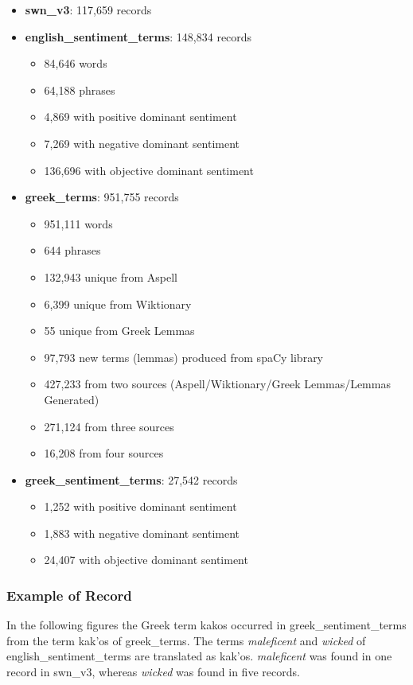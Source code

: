 \begin{itemize}
 \item \textbf{swn\_v3}: 117,659 records
 \item \textbf{english\_sentiment\_terms}: 148,834 records
 \begin{itemize}
  \item 84,646 words
  \item 64,188 phrases
  \item 4,869 with positive dominant sentiment
  \item 7,269 with negative dominant sentiment
  \item 136,696 with objective dominant sentiment
 \end{itemize}
 \item \textbf{greek\_terms}: 951,755 records
 \begin{itemize}
  \item 951,111 words
  \item 644 phrases
  \item 132,943 unique from Aspell
  \item 6,399 unique from Wiktionary
  \item 55 unique from Greek Lemmas
  \item 97,793 new terms (lemmas) produced from spaCy library
  \item 427,233 from two sources (Aspell/Wiktionary/Greek Lemmas/Lemmas Generated)
  \item 271,124 from three sources
  \item 16,208 from four sources
 \end{itemize}
 \item \textbf{greek\_sentiment\_terms}: 27,542 records
 \begin{itemize}
  \item 1,252 with positive dominant sentiment
  \item 1,883 with negative dominant sentiment
  \item 24,407 with objective dominant sentiment
 \end{itemize} 
\end{itemize}

\subsubsection{Example of Record}
\label{subsubsec:recexample}

In the following figures
the Greek term \textgreek{kakos} occurred in greek\_sentiment\_terms
from the term \textgreek{kak'os} of greek\_terms.
The terms \emph{maleficent} and \emph{wicked} of english\_sentiment\_terms
are translated as \textgreek{kak'os}.
\emph{maleficent} was found in one record in swn\_v3,
whereas \emph{wicked} was found in five records. \\

